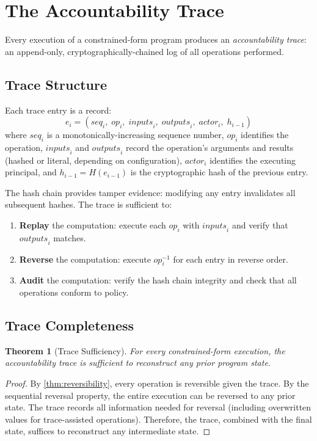 \documentclass[11pt,a4paper]{article}
\newtheorem{theorem}{Theorem}[section]
\newcommand{\inv}[1]{#1^{-1}}
\begin{document}
\section{The Accountability Trace}
\label{sec:trace}

Every execution of a constrained-form program produces an
\emph{accountability trace}: an append-only, cryptographically-chained log of
all operations performed.

\subsection{Trace Structure}

Each trace entry is a record:
\[
  e_i = (\mathit{seq}_i, \; \mathit{op}_i, \; \mathit{inputs}_i, \;
         \mathit{outputs}_i, \; \mathit{actor}_i, \; h_{i-1})
\]
where $\mathit{seq}_i$ is a monotonically-increasing sequence number,
$\mathit{op}_i$ identifies the operation, $\mathit{inputs}_i$ and
$\mathit{outputs}_i$ record the operation's arguments and results (hashed or
literal, depending on configuration), $\mathit{actor}_i$ identifies the
executing principal, and $h_{i-1} = H(e_{i-1})$ is the cryptographic hash of
the previous entry.

The hash chain provides tamper evidence: modifying any entry invalidates all
subsequent hashes.  The trace is sufficient to:
\begin{enumerate}[nosep]
  \item \textbf{Replay} the computation: execute each $\mathit{op}_i$ with
    $\mathit{inputs}_i$ and verify that $\mathit{outputs}_i$ matches.
  \item \textbf{Reverse} the computation: execute $\inv{\mathit{op}_i}$
    for each entry in reverse order.
  \item \textbf{Audit} the computation: verify the hash chain integrity and
    check that all operations conform to policy.
\end{enumerate}

\subsection{Trace Completeness}

\begin{theorem}[Trace Sufficiency]
For every constrained-form execution, the accountability trace is sufficient
to reconstruct any prior program state.
\end{theorem}

\begin{proof}
By \cref{thm:reversibility}, every operation is reversible given the trace.
By the sequential reversal property, the entire execution can be reversed to
any prior state.  The trace records all information needed for reversal
(including overwritten values for trace-assisted operations).  Therefore, the
trace, combined with the final state, suffices to reconstruct any
intermediate state.
\end{proof}
\end{document}
